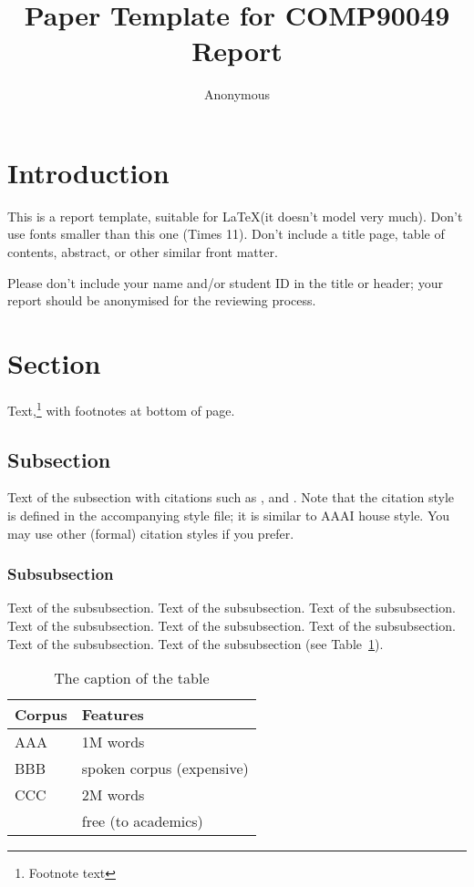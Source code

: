 \documentclass[11pt]{article}
\title{Paper Template for COMP90049 Report}
\author
{Anonymous}
\begin{document}
\maketitle



\section{Introduction}

This is a report template, suitable for \LaTeX (it doesn't model very much).
Don't use fonts smaller than this one (Times 11). Don't include a title page,
table of contents, abstract, or other similar front matter.

Please don't include your name and/or student ID in the title or header; 
your report should be anonymised for the reviewing process.


\section{Section}

Text,\footnote{Footnote text} with footnotes at bottom of page.


\subsection{Subsection}

Text of the subsection with citations such as 
,  and .
Note that the citation style is defined in the accompanying
style file; it is similar to AAAI house style. You may use
other (formal) citation styles if you prefer.

 
\subsubsection{Subsubsection}

Text of the subsubsection.
Text of the subsubsection.
Text of the subsubsection.
Text of the subsubsection.
Text of the subsubsection.
Text of the subsubsection.
Text of the subsubsection.
Text of the subsubsection (see Table~\ref{table1}).

\begin{table}[h]
 \begin{center}
\begin{tabular}{|l|l|}

      \hline
      Corpus & Features\\
      \hline\hline
      AAA & 1M words\\
      BBB & spoken corpus (expensive)\\
      CCC & 2M words\\
        & free (to academics)\\
      \hline

\end{tabular}
\caption{The caption of the table}\label{table1}
 \end{center}
\end{table}
\end{document}
